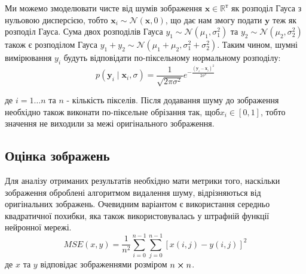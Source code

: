 \documentclass[14pt,a4paper]{extarticle}
\newcounter{e}
\numberwithin{equation}{section}
\numberwithin{figure}{section}
\begin{document}
	Ми можемо змоделювати чисте від шумів зображення $\mathbf{x} \in \mathbb{R}^{т}$ як розподіл Гауса з нульовою дисперсією, тобто $\mathbf{x}_{i} \sim \mathcal{N}(\mathbf{x}, 0)$, що дає нам змогу подати $\mathbf{y}$ теж як розподіл Гауса. Сума двох розподілів Гауса $y_{1} \sim \mathcal{N}\left(\mu_{1}, \sigma_{1}^{2}\right)$ та $y_{2} \sim \mathcal{N}\left(\mu_{2}, \sigma_{2}^{2}\right)$ також є розподілом Гауса $y_{1}+y_{2} \sim \mathcal{N}\left(\mu_{1}+\mu_{2}, \sigma_{1}^{2}+\sigma_{2}^{2}\right)$. Таким чином, шумні  вимірювання $y_{i}$ будуть відповідати по-піксельному нормальному розподілу:
	\begin{equation}
		p\left(\mathbf{y}_{i} \mid \mathbf{x}_{i}, 		\sigma\right)=\frac{1}{\sqrt{2 \pi \sigma^{2}}} e^{-\frac{\left(\mathbf{y}_{i}-\mathbf{x}_{i}\right)^{2}}{2 \sigma^{2}}}
	\end{equation}
	
	де $i = 1\dotsc n$ та $n$ - кількість пікселів. Після додавання шуму до зображення необхідно також виконати по-піксельне обрізання так, щоб$x_i \in [0, 1]$, тобто значення не виходили за межі оригінального зображення.
		
	\subsection{Оцінка зображень}
	Для аналізу отриманих результатів необхідно мати метрики того, наскільки зображення оброблені алгоритмом видалення шуму,  відрізняються від оригінальних зображень. Очевидним варіантом є використання середньо квадратичної похибки, яка також використовувалась у штрафній функції нейронної мережі.
	\begin{equation}
		M S E(x, y) =\frac{1}{n^2} \sum_{i=0}^{n-1} \sum_{j=0}^{n-1}[x(i, j)-y(i, j)]^{2}
	\end{equation}
	де $x$ та $y$ відповідає зображеннями розміром $n \cross n$.
\end{document}
